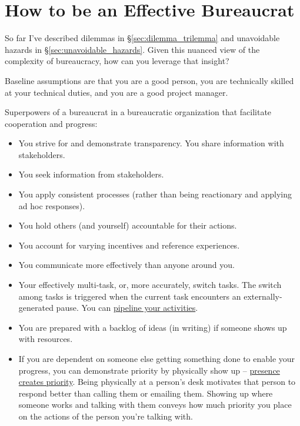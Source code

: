 \section{How to be an Effective Bureaucrat\label{sec:effective_bureaucrat}}

So far I've described dilemmas in \S\ref{sec:dilemma_trilemma} and unavoidable hazards in \S\ref{sec:unavoidable_hazards}. Given this nuanced view of the complexity of bureaucracy, how can you leverage that insight?

Baseline assumptions are that you are a good person, you are technically skilled at your technical duties, and you are a good project manager. 


Superpowers of a bureaucrat in a bureaucratic organization that facilitate cooperation and progress:

\begin{itemize}
\item You strive for and demonstrate transparency. You share information with stakeholders.
\item You seek information from stakeholders.
\item You apply consistent processes (rather than being reactionary and applying ad hoc responses).
\item You hold others (and yourself) accountable for their actions.
\item You account for varying incentives and reference experiences.
    \item You communicate more effectively than anyone around you.
    \item Your effectively multi-task, or, more accurately, switch tasks. The switch among tasks is triggered when the current task encounters an externally-generated pause. You can \href{https://en.wikipedia.org/wiki/Pipeline_(computing)#Concept_and_motivation}{pipeline your activities}.
    \item You are prepared with a backlog of ideas (in writing) if someone shows up with resources.
    \item If you are dependent on someone else getting something done to enable your progress, you can demonstrate priority by physically show up -- \underline{presence creates priority}. Being physically at a person's desk motivates that person to respond better than calling them or emailing them. Showing up where someone works and talking with them conveys how much priority you place on the actions of the person you're talking with.

\end{itemize}
